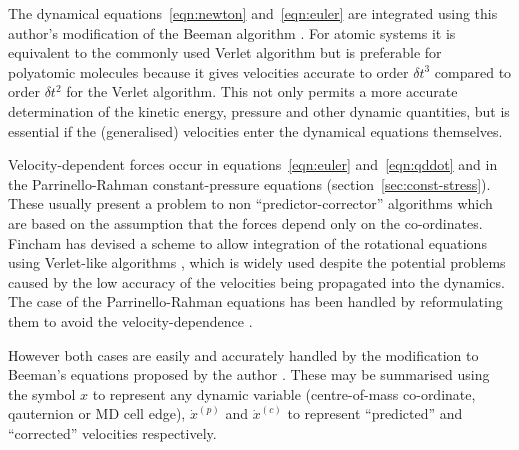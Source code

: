 The dynamical equations~\ref{eqn:newton} and~\ref{eqn:euler} are
integrated using this author's modification \cite{refson:85} of the
Beeman algorithm \cite{beeman:76}.  For atomic systems it is
equivalent to the commonly used Verlet algorithm \cite{verlet:67} but
is preferable for polyatomic molecules because it gives velocities
accurate to order $\delta t^3$ compared to order $\delta t^2$ for the
Verlet algorithm.  This not only permits a more accurate determination
of the kinetic energy, pressure and other dynamic quantities, but is
essential if the (generalised) velocities enter the dynamical
equations themselves.  

Velocity-dependent forces occur in equations~\ref{eqn:euler}
and~\ref{eqn:qddot} and in the Parrinello-Rahman constant-pressure
equations (section~\ref{sec:const-stress}). These usually present a
problem to non ``predictor-corrector'' algorithms which are based on
the assumption that the forces depend only on the co-ordinates.
Fincham has devised a scheme to allow integration of the rotational
equations using Verlet-like algorithms \cite{fincham:81}, which is
widely used despite the potential problems caused by the low
accuracy of the velocities being propagated into the dynamics.  The
case of the Parrinello-Rahman equations has been handled by
reformulating them to avoid the velocity-dependence \cite{dove:??}.

However both cases are easily and accurately handled by the
modification to Beeman's equations proposed by the author
\cite{refson:85}.  These may be summarised using the symbol $x$ 
to represent any dynamic variable (centre-of-mass co-ordinate,
qauternion or MD cell edge), $\dot{x}^{(p)}$ and $\dot{x}^{(c)}$ to
represent ``predicted'' and ``corrected'' velocities respectively.

